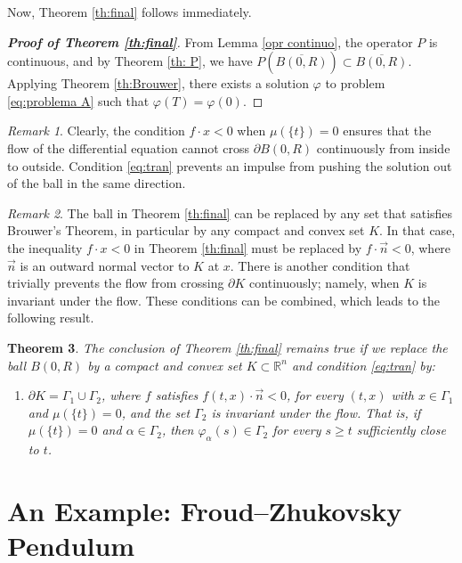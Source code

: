 \documentclass[a4paper,11pt]{amsart}
\theoremstyle{plain}
\newtheorem{thm}{Theorem}[section]
\theoremstyle{remark}
\newtheorem{obs}[thm]{Remark}
\newcommand{\rr}{\mathbb{R}}
\numberwithin{equation}{section}
\begin{document}
Now, Theorem \ref{th:final} follows immediately.

\begin{proof}[\textbf{Proof of Theorem \ref{th:final}}]
From Lemma \ref{opr continuo}, the operator $P$ is continuous, and by Theorem \ref{th: P}, we have $P\left( \overline{B(0,R)}\right)\subset\overline{B(0,R)}$. Applying Theorem \ref{th:Brouwer}, there exists a solution $\varphi$ to problem \eqref{eq:problema A} such that $\varphi(T)=\varphi(0)$.
\end{proof} 
\begin{obs} Clearly, the condition $f\cdot x<0$ when $\mu(\{t\})=0$ ensures that the flow of the differential equation cannot cross $\partial B(0,R)$ continuously from inside to outside. Condition \ref{eq:tran} prevents an impulse from pushing the solution out of the ball in the same direction. 
\end{obs}

\begin{obs}\label{rem:otroK}
The ball in Theorem \ref{th:final} can be replaced by any set that satisfies Brouwer's Theorem, in particular by any compact and convex set $K$. In that case, the inequality $f\cdot x<0$ in Theorem \ref{th:final} must be replaced by $f\cdot \vec{n}<0$, where $\vec{n}$ is an outward normal vector to $K$ at $x$. There is another condition that trivially prevents the flow from crossing $\partial K$ continuously; namely, when $K$ is invariant under the flow. These conditions can be combined, which leads to the following result.
\end{obs}
  
\begin{thm}\label{th:prin_ger} The conclusion of Theorem \ref{th:final} remains true if we replace the ball $B(0,R)$ by a compact and convex set $K\subset \rr^n$ and condition \ref{eq:tran} by:
\begin{enumerate}[label=$(H'_{4\arabic*})$,ref=$(H'_{4\arabic*})$]
    \item[$(H'_{43})$]\label{hip:alter} $\partial K=\Gamma_1\cup \Gamma_2$, where $f$ satisfies
    $
 f(t,x)\cdot \vec{n}<0$, for every $(t, x)$ with $x\in\Gamma_1$ and $\mu(\{t\})=0$,
      and the set $\Gamma_2$ is invariant under the flow. That is, if $\mu(\{t\})=0$ and $\alpha\in \Gamma_2$, then $\varphi_\alpha(s)\in \Gamma_2$ for every $s\geq t$ sufficiently close to $t$.
\end{enumerate}
\end{thm}
  
\section{An Example: Froud--Zhukovsky Pendulum}\label{sec:ejem}
\end{document}
